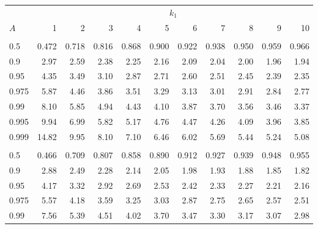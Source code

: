 \documentclass[]{article}
\begin{document}
\begin{table}[H]
\centering
\begin{tabular}{lrrrrrrrrrr}
\toprule
\multicolumn{1}{c}{ } & \multicolumn{10}{c}{$k_1$} \\
\cmidrule(l{3pt}r{3pt}){2-11}
\hspace{1.1em}$A$ & 1 & 2 & 3 & 4 & 5 & 6 & 7 & 8 & 9 & 10\\
\midrule
\addlinespace[0.3em]
\multicolumn{11}{l}{\textbf{$k_2=20$}}\\
\hspace{1em}0.5 & 0.472 & 0.718 & 0.816 & 0.868 & 0.900 & 0.922 & 0.938 & 0.950 & 0.959 & 0.966\\
\hspace{1em}0.9 & 2.97 & 2.59 & 2.38 & 2.25 & 2.16 & 2.09 & 2.04 & 2.00 & 1.96 & 1.94\\
\hspace{1em}0.95 & 4.35 & 3.49 & 3.10 & 2.87 & 2.71 & 2.60 & 2.51 & 2.45 & 2.39 & 2.35\\
\hspace{1em}0.975 & 5.87 & 4.46 & 3.86 & 3.51 & 3.29 & 3.13 & 3.01 & 2.91 & 2.84 & 2.77\\
\hspace{1em}0.99 & 8.10 & 5.85 & 4.94 & 4.43 & 4.10 & 3.87 & 3.70 & 3.56 & 3.46 & 3.37\\
\hspace{1em}0.995 & 9.94 & 6.99 & 5.82 & 5.17 & 4.76 & 4.47 & 4.26 & 4.09 & 3.96 & 3.85\\
\hspace{1em}0.999 & 14.82 & 9.95 & 8.10 & 7.10 & 6.46 & 6.02 & 5.69 & 5.44 & 5.24 & 5.08\\
\addlinespace[0.3em]
\multicolumn{11}{l}{\textbf{$k_2=30$}}\\
\hspace{1em}0.5 & 0.466 & 0.709 & 0.807 & 0.858 & 0.890 & 0.912 & 0.927 & 0.939 & 0.948 & 0.955\\
\hspace{1em}0.9 & 2.88 & 2.49 & 2.28 & 2.14 & 2.05 & 1.98 & 1.93 & 1.88 & 1.85 & 1.82\\
\hspace{1em}0.95 & 4.17 & 3.32 & 2.92 & 2.69 & 2.53 & 2.42 & 2.33 & 2.27 & 2.21 & 2.16\\
\hspace{1em}0.975 & 5.57 & 4.18 & 3.59 & 3.25 & 3.03 & 2.87 & 2.75 & 2.65 & 2.57 & 2.51\\
\hspace{1em}0.99 & 7.56 & 5.39 & 4.51 & 4.02 & 3.70 & 3.47 & 3.30 & 3.17 & 3.07 & 2.98\\

\end{tabular}
\end{table}
\end{document}
